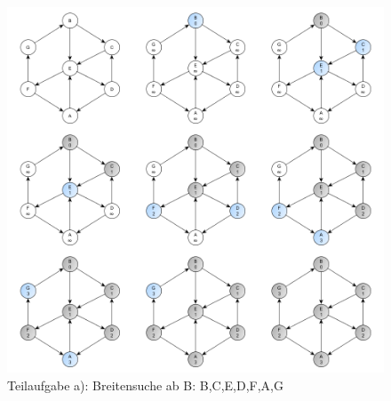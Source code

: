\documentclass[12pt]{scrartcl}
\begin{document}

\exercise{}
\begin{figure}[h!]
\begin{center}
\includegraphics[scale=0.5]{BBreitensuche.png}
\caption{Teilaufgabe a): Breitensuche ab B: B,C,E,D,F,A,G}
\end{center}
\end{figure}

\newpage
\end{document}
